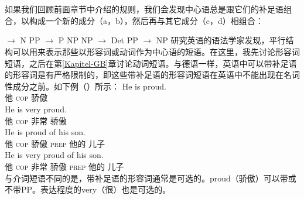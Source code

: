 \section{\xbartc}
\label{sec-xbar}

如果我们回顾前面章节中介绍的规则，我们会发现中心语总是跟它们的补足语组合，以构成一个新的成分（a，b），然后再与其它成分（c，d）相组合：

\eal
\ex \nbar $\to$ N PP
\ex \pbar $\to$ P NP
\ex\label{Regel-NP-Xbar}
    NP $\to$ Det \nbar
\ex PP $\to$ NP \pbar
\zl
%
研究英语的语法学家发现，平行结构可以用来表示那些以形容词或动词作为中心语的短语。在这里，我先讨论形容词短语，之后在第\ref{Kapitel-GB}章讨论动词短语。与德语一样，英语中可以带补足语的形容词是有严格限制的，即这些带补足语的形容词短语在英语中不能出现在名词性成分之前。如下例（）所示：
\eal
\ex 
\gll He is proud.\\
     他 \textsc{cop} 骄傲\\
\ex 
\gll He is very proud.\\
他 \textsc{cop} 非常 骄傲\\
\ex 
\gll He is proud of his son.\\
他 \textsc{cop} 骄傲 \textsc{prep} 他的 儿子\\
\ex 
\gll He is very proud of his son.\\
他 \textsc{cop} 非常 骄傲 \textsc{prep} 他的 儿子\\
\zl
与介词短语不同的是，带补足语的形容词通常是可选的。proud（骄傲）可以带或不带PP。表达程度的very（很）也是可选的。

